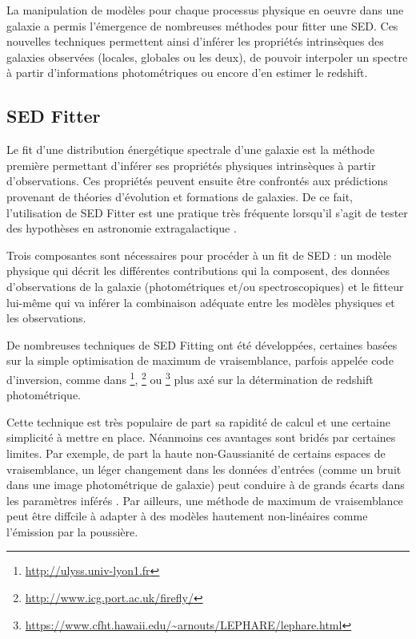 \documentclass[../main/main.tex]{subfiles}
\begin{document}
La manipulation de modèles pour chaque processus physique en oeuvre dans
une galaxie a permis l'émergence de nombreuses méthodes pour fitter une
SED. Ces nouvelles techniques permettent ainsi d'inférer les propriétés intrinsèques des galaxies
observées (locales, globales ou les deux), de pouvoir interpoler un
spectre à partir d'informations photométriques ou encore d'en estimer le
redshift.

\subsection{SED Fitter}

Le fit d'une distribution énergétique spectrale d'une galaxie est la
méthode première permettant d'inférer ses propriétés physiques intrinsèques à
partir d'observations. Ces propriétés peuvent ensuite être confrontés
aux prédictions provenant de théories d'évolution et formations de
galaxies. De ce fait, l'utilisation de SED Fitter est une pratique très
fréquente
lorsqu'il s'agit de tester des hypothèses en astronomie extragalactique
\citep{Tinsley1980, Walcher2011, Conroy2013, Chevallard2016, Briday22}. 

Trois composantes sont nécessaires pour procéder à un fit de SED : un
modèle physique qui décrit les différentes contributions qui la
composent, des données d'observations de la galaxie (photométriques
et/ou spectroscopiques) et le fitteur lui-même qui va inférer la
combinaison adéquate entre les modèles physiques et les observations.

De nombreuses techniques de SED Fitting ont été développées, certaines
basées sur 
la simple optimisation de maximum de vraisemblance, parfois appelée code
d'inversion, comme dans \footnote{\url{http://ulyss.univ-lyon1.fr}}\citep{KolevaUlyss}, \footnote{\url{http://www.icg.port.ac.uk/firefly/}}
\citep{WilkinsonFirefly} ou \footnote{\url{https://www.cfht.hawaii.edu/~arnouts/LEPHARE/lephare.html}} \citep{ArnoutsLephare} plus
axé sur la détermination de redshift photométrique.

Cette technique est très populaire de part sa rapidité de calcul et une
certaine simplicité à mettre en place. Néanmoins ces avantages sont
bridés par certaines limites. Par exemple, de part la haute
non-Gaussianité de certains espaces de vraisemblance, un léger changement
dans les données d'entrées (comme un bruit dans une image photométrique
de galaxie) peut conduire à de grands écarts dans les paramètres
inférés \citep{Ocvirk}.
Par ailleurs, une méthode de maximum de vraisemblance peut être diffcile à adapter
à des modèles hautement non-linéaires comme l'émission par la poussière.
\end{document}
